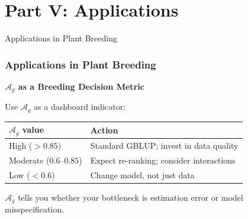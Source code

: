 \documentclass[aspectratio=169,11pt]{beamer}
\newcommand{\Ag}{\mathcal{A}_g}
\begin{document}
\section{Part V: Applications}

\begin{frame}{Applications in Plant Breeding}
\frametitle{Applications in Plant Breeding}

\textbf{$\Ag$ as a Breeding Decision Metric}

Use $\Ag$ as a dashboard indicator:

\begin{center}
\begin{tabular}{ll}
\toprule
\textbf{$\Ag$ value} & \textbf{Action} \\
\midrule
High ($> 0.85$) & Standard GBLUP; invest in data quality \\
Moderate ($0.6$--$0.85$) & Expect re-ranking; consider interactions \\
Low ($< 0.6$) & Change model, not just data \\
\bottomrule
\end{tabular}
\end{center}

\vspace{0.3cm}
$\Ag$ tells you whether your bottleneck is estimation error or model misspecification.

\end{frame}
\end{document}
